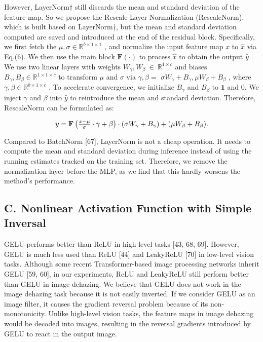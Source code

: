 \documentclass{article}
\begin{document}
However, LayerNorm† still discards the mean and standard deviation of the feature map. So we propose the Rescale Layer Normalization (RescaleNorm), which is built based on LayerNorm†, but the mean and standard deviation computed are saved and introduced at the end of the residual block. Specifically, we first fetch the $\mu,\sigma\in\mathbb{R}^{b\times1\times1}$ , and normalize the input feature map $x$ to $\hat{x}$ via Eq.(6). We then use the main block $\mathbf{F}(\cdot)$ to process $\hat{x}$ to obtain the output $\hat{y}$ . We use two linear layers with weights $W_{\gamma},W_{\beta}~\in~\mathbb{R}^{1\times c}$ and biases $B_{\gamma},B_{\beta}\in\mathbb{R}^{1\times1\times c}$ to transform $\mu$ and $\sigma$ via ${\gamma,\beta}=$ ${\sigma W_{\gamma}+B_{\gamma},\mu W_{\beta}+B_{\beta}}$ , where $\gamma,\beta\in\mathbb{R}^{b\times1\times c}$ . To accelerate convergence, we initialize $B_{\gamma}$ and $B_{\beta}$ to $\mathbf{1}$ and 0. We inject $\gamma$ and $\beta$ into $\hat{y}$ to reintroduce the mean and standard deviation. Therefore, RescaleNorm can be formulated as:


\[
$$$$y=\mathbf F\left(\frac{x-\mu}{\sigma}\cdot\gamma+\beta\right)\cdot(\sigma W_{\gamma}+B_{\gamma})+(\mu W_{\beta}+B_{\beta}).
\]


Compared to BatchNorm [67], LayerNorm is not a cheap operation. It needs to compute the mean and standard deviation during inference instead of using the running estimates tracked on the training set. Therefore, we remove the normalization layer before the MLP, as we find that this hardly worsens the method’s performance.


\subsection{C. Nonlinear Activation Function with Simple Inversal}


GELU performs better than ReLU in high-level tasks [43, 68, 69]. However, GELU is much less used than ReLU [44] and LeakyReLU [70] in low-level vision tasks. Although some recent Transformer-based image processing networks inherit GELU [59, 60], in our experiments, ReLU and LeakyReLU still perform better than GELU in image dehazing. We believe that GELU does not work in the image dehazing task because it is not easily inverted. If we consider GELU as an image filter, it causes the gradient reversal problem because of its non-monotonicity. Unlike high-level vision tasks, the feature maps in image dehazing would be decoded into images, resulting in the reversal gradients introduced by GELU to react in the output image.
\end{document}
